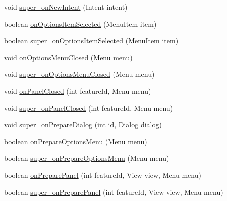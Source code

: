 \begin{DoxyCompactItemize}
\item 
void \hyperlink{classorg_1_1qtproject_1_1qt5_1_1android_1_1bindings_1_1_qt_activity_afb8a02b6c2e3c8e868f8cce113f50b18}{super\+\_\+on\+New\+Intent} (Intent intent)
\item 
boolean \hyperlink{classorg_1_1qtproject_1_1qt5_1_1android_1_1bindings_1_1_qt_activity_a1062f0dfba41ba945835041b94bfe4fa}{on\+Options\+Item\+Selected} (Menu\+Item item)
\item 
boolean \hyperlink{classorg_1_1qtproject_1_1qt5_1_1android_1_1bindings_1_1_qt_activity_aab1ebb0d4fe4429af0b9e79a4a6295ad}{super\+\_\+on\+Options\+Item\+Selected} (Menu\+Item item)
\item 
void \hyperlink{classorg_1_1qtproject_1_1qt5_1_1android_1_1bindings_1_1_qt_activity_aad115f4cdaebb71916b85ac6309a83c4}{on\+Options\+Menu\+Closed} (Menu menu)
\item 
void \hyperlink{classorg_1_1qtproject_1_1qt5_1_1android_1_1bindings_1_1_qt_activity_abd8ef4d5f57f3046c3065cbe806f690b}{super\+\_\+on\+Options\+Menu\+Closed} (Menu menu)
\item 
void \hyperlink{classorg_1_1qtproject_1_1qt5_1_1android_1_1bindings_1_1_qt_activity_a2b39eac5b8b7003b20171ddce6b16e37}{on\+Panel\+Closed} (int feature\+Id, Menu menu)
\item 
void \hyperlink{classorg_1_1qtproject_1_1qt5_1_1android_1_1bindings_1_1_qt_activity_a5f9ad8da2fcebff92ef8c86583091d75}{super\+\_\+on\+Panel\+Closed} (int feature\+Id, Menu menu)
\item 
void \hyperlink{classorg_1_1qtproject_1_1qt5_1_1android_1_1bindings_1_1_qt_activity_aacc652635f4bf45e2fa182dc44e8df13}{super\+\_\+on\+Prepare\+Dialog} (int id, Dialog dialog)
\item 
boolean \hyperlink{classorg_1_1qtproject_1_1qt5_1_1android_1_1bindings_1_1_qt_activity_a71a7e747de798c51b6a385b5e8a99c61}{on\+Prepare\+Options\+Menu} (Menu menu)
\item 
boolean \hyperlink{classorg_1_1qtproject_1_1qt5_1_1android_1_1bindings_1_1_qt_activity_a9f7f63be6b9a75253b784e80bfa74f69}{super\+\_\+on\+Prepare\+Options\+Menu} (Menu menu)
\item 
boolean \hyperlink{classorg_1_1qtproject_1_1qt5_1_1android_1_1bindings_1_1_qt_activity_a668c15554849a0bce9422eb709b5cacc}{on\+Prepare\+Panel} (int feature\+Id, View view, Menu menu)
\item 
boolean \hyperlink{classorg_1_1qtproject_1_1qt5_1_1android_1_1bindings_1_1_qt_activity_ab8af6f3b5a5b4547829dc68e7c31fd86}{super\+\_\+on\+Prepare\+Panel} (int feature\+Id, View view, Menu menu)

\end{DoxyCompactItemize}
